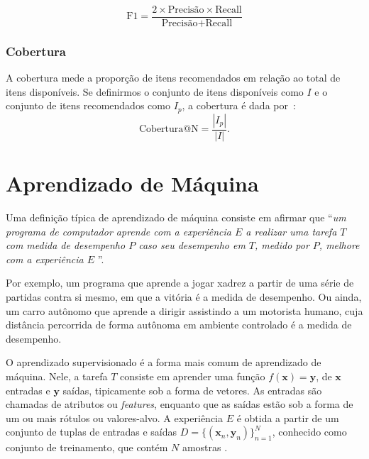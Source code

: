 \begin{equation}
  \text{F1} = \frac{2 \times \text{Precisão} \times \text{Recall}}{\text{Precisão} + \text{Recall}}
\end{equation}

  \subsubsection{Cobertura}
  A cobertura mede a proporção de itens recomendados em relação ao total de
  itens disponíveis. Se definirmos o conjunto de itens disponíveis como $I$ e o
  conjunto de itens recomendados como $I_{p}$, a cobertura é dada por~\cite{sessionbaseddp}:
  \begin{equation}
    \text{Cobertura@N} = \frac{|I_{p}|}{|I|}.
  \end{equation}


\section{Aprendizado de Máquina}
Uma definição típica de aprendizado de máquina consiste em afirmar que ``\textit{um
programa de computador aprende com a experiência $E$ a realizar uma tarefa $T$
com medida de desempenho $P$ caso seu desempenho em $T$, medido por $P$, melhore
com a experiência $E$} ''\cite{mitchell1997}.

Por exemplo, um programa que aprende a jogar xadrez a partir de uma série de
partidas contra si mesmo, em que a vitória é a medida de desempenho. Ou ainda,
um carro autônomo que aprende a dirigir assistindo a um motorista humano, cuja
distância percorrida de forma autônoma em ambiente controlado é a medida de
desempenho.

O aprendizado supervisionado é a forma mais comum de aprendizado de máquina.
Nele, a tarefa $T$ consiste em aprender uma função $f(\mathbf{x}) = \mathbf{y}$,
de $\mathbf{x}$ entradas e $\mathbf{y}$ saídas, tipicamente sob a forma de
vetores. As entradas são chamadas de atributos ou \textit{features}, enquanto
que as saídas estão sob a forma de um ou mais rótulos ou valores-alvo. A
experiência $E$ é obtida a partir de um conjunto de tuplas de entradas e saídas
$D = \{(\mathbf{x}_n, \mathbf{y}_n)\}_{n=1}^N$, conhecido como conjunto de
treinamento, que contém $N$ amostras \cite{pml1Book}.

